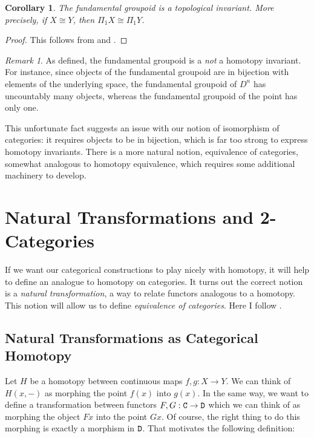 \documentclass[11 pt]{amsart}
\theoremstyle{plain}   %
\newtheorem{cor}{Corollary}[section]
\theoremstyle{definition}
\theoremstyle{remark}
\newtheorem{rem}{Remark}[section]
\numberwithin{equation}{section}
\newcommand{\cat}[1]{{\normalfont\texttt{#1}}}
\begin{document}
\begin{cor}\label{fundamental groupoid is topological}
	The fundamental groupoid is a topological invariant. More precisely, if
	$X\cong Y$, then $\Pi_1X\cong \Pi_1Y$.
\end{cor}

\begin{proof}
	This follows from  and .
\end{proof}

\begin{rem}\label{fundamental groupoid is not homotopy invariant} As defined,
	the fundamental groupoid is a \emph{not} a homotopy invariant. For instance,
	since objects of the fundamental groupoid are in bijection with elements of
	the underlying space, the fundamental groupoid of $D^n$ has uncountably many
	objects, whereas the fundamental groupoid of the point has only one. \end{rem}

This unfortunate fact suggests an issue with our notion of isomorphism of
categories: it requires objects to be in bijection, which is far too strong to
express homotopy invariants. There is a more natural notion, equivalence of
categories, somewhat analogous to homotopy equivalence, which requires some
additional machinery to develop.

\section{Natural Transformations and 2-Categories}
\label{natural transformations}

If we want our categorical constructions to play nicely with homotopy, it will
help to define an analogue to homotopy on categories. It turns out the correct
notion is a \emph{natural transformation}, a way to relate functors analogous to
a homotopy. This notion will allow us to define \emph{equivalence of
	categories}. Here I follow \cite[Sections 1.4-1.7]{Riehl}.

\subsection{Natural Transformations as Categorical Homotopy}

Let $H$ be a homotopy between continuous maps $f,g: X\rightarrow Y$. We can think
of $H(x, -)$ as morphing the point $f(x)$ into $g(x)$. In the same way, we want to define
a transformation between functors $F,G: \cat{C}\rightarrow\cat{D}$ which we can
think of as morphing the object $Fx$ into the point $Gx$. Of course, the right
thing to do this morphing is exactly a morphism in $\cat{D}$. That motivates the
following definition:
\end{document}

